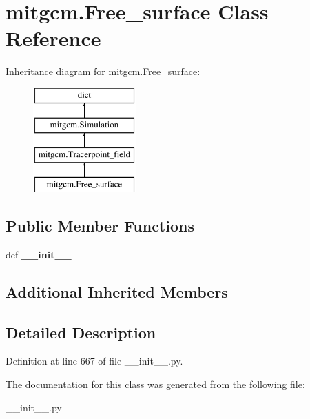 \hypertarget{classmitgcm_1_1Free__surface}{\section{mitgcm.\+Free\+\_\+surface Class Reference}
\label{classmitgcm_1_1Free__surface}
}
Inheritance diagram for mitgcm.\+Free\+\_\+surface\+:\begin{figure}[H]
\begin{center}
\leavevmode
\includegraphics[height=4.000000cm]{classmitgcm_1_1Free__surface}
\end{center}
\end{figure}
\subsection*{Public Member Functions}
\begin{DoxyCompactItemize}
\item 
\hypertarget{classmitgcm_1_1Free__surface_a92630a9966a8f863bfa7d58aa844ad41}{def {\bfseries \+\_\+\+\_\+init\+\_\+\+\_\+}}\label{classmitgcm_1_1Free__surface_a92630a9966a8f863bfa7d58aa844ad41}

\end{DoxyCompactItemize}
\subsection*{Additional Inherited Members}


\subsection{Detailed Description}


Definition at line 667 of file \+\_\+\+\_\+init\+\_\+\+\_\+.\+py.



The documentation for this class was generated from the following file\+:\begin{DoxyCompactItemize}
\item 
\+\_\+\+\_\+init\+\_\+\+\_\+.\+py\end{DoxyCompactItemize}
